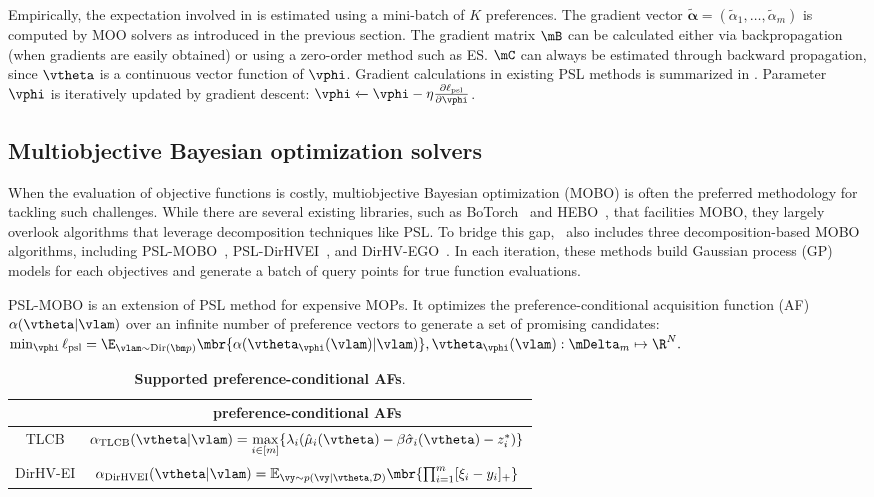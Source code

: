 Empirically, the expectation involved in  is estimated using a mini-batch of \(K\) preferences. The gradient vector \(\tilde{\bm \alpha} =(\tilde{\alpha}_1, \ldots, \tilde{\alpha}_m)\) is computed by MOO solvers as introduced in the previous section. The gradient matrix \(\mB\) can be calculated either via backpropagation (when gradients are easily obtained) or using a zero-order method such as ES. \(\mC\) can always be estimated through backward propagation, since \(\vtheta\) is a continuous vector function of \(\vphi\). Gradient calculations in existing PSL methods is summarized in . Parameter \(\vphi\) is iteratively updated by gradient descent: \(\vphi \xleftarrow{} \vphi - \eta \frac{\partial \ell_\mathrm{psl}}{\partial \vphi}\).

\subsection{Multiobjective Bayesian optimization solvers}
\label{sec:mobod}
When the evaluation of objective functions is costly, multiobjective Bayesian optimization (MOBO) is often the preferred methodology for tackling such challenges. While there are several existing libraries, such as BoTorch~\cite{balandat2020botorch} and HEBO~\cite{Cowen-Rivers2022-HEBO}, that facilities MOBO, they largely overlook algorithms that leverage decomposition techniques like PSL. To bridge this gap, \algoname~also includes three decomposition-based MOBO algorithms, including PSL-MOBO~\cite{lin2022pslmobo}, PSL-DirHVEI~\cite{lin2022pslmobo,zhao2024hypervolume}, and DirHV-EGO~\cite{zhao2024hypervolume}. In each iteration, these methods build Gaussian process (GP) models for each objectives and generate a batch of query points for true function evaluations.

PSL-MOBO is an extension of PSL method for expensive MOPs. It optimizes the preference-conditional acquisition function (AF) $\alpha(\vtheta|\vlam)$ over an infinite number of preference vectors to generate a set of promising candidates:
$
   \min_\vphi \ell_\mathrm{psl} = \E_{\vlam \sim \mathrm{Dir}(\bm p)} \mbr{\alpha(\vtheta_\vphi(\vlam)|\vlam)}, \vtheta_\vphi(\vlam) : \mDelta_m \mapsto\R^N.
$
 \begin{wraptable}{r}{0.6\textwidth}
     \centering
     \setlength\tabcolsep{1.5 pt}
     \caption{\textbf{Supported preference-conditional AFs}.} \label{tab:mobod:acquisition}
     \small
     \begin{tabular}{c|c}
     \toprule
      & preference-conditional AFs  \\ \midrule
      TLCB & $\alpha_\mathrm{{TLCB}}(\vtheta|\vlam)=\underset{i \in [m]}{\max}\{\lambda_i(\hat{\mu}_i(\vtheta)-\beta\hat{\sigma}_i(\vtheta)-z_i^*)\}$  \\
         DirHV-EI &  $\alpha_\mathrm{{DirHVEI}}(\vtheta | \vlam) =\mathbb{E}_{\vy\sim p(\vy | \vtheta,\mathcal{D})} \mbr{ \prod_{i=1}^{m} [\xi_i-y_i]_{+} }$ \\
     \bottomrule
\end{tabular}
\vspace{-9pt}
\end{wraptable}

